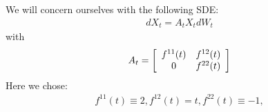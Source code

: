 We will concern ourselves with the following SDE:
\begin{align*}
	 dX_t = A_t X_t dW_t
\end{align*}
with
\begin{align*}
A_t=
\left[
\begin{array}[c]{cc}
f^{11}(t) & f^{12}(t)\\
0 & f^{22}(t)
\end{array}
\right]
\end{align*}
Here we chose:\begin{align*}
f^{11}(t)\equiv 2,
f^{12}(t)= t,
f^{22}(t)\equiv -1,
\end{align*}
